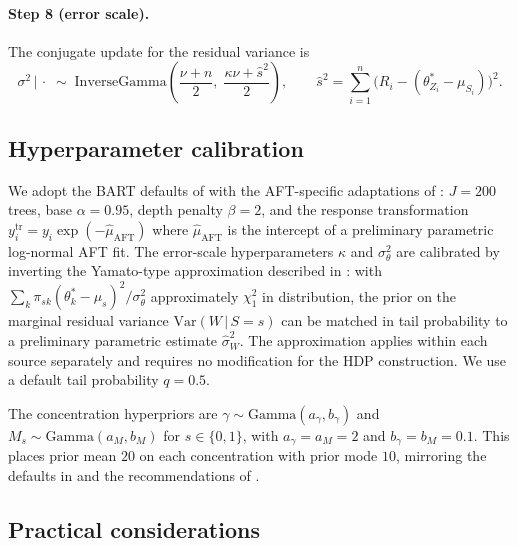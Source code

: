 \documentclass[11pt]{article}
\theoremstyle{plain}
\theoremstyle{definition}
\theoremstyle{remark}
\newcommand{\1}{\mathds{1}}
\newcommand{\Var}{\mathrm{Var}}
\newcommand{\given}{\,|\,}
\begin{document}
\paragraph{Step 8 (error scale).} The conjugate update for the residual variance is
\begin{equation}
\sigma^2 \given \cdot \;\sim\; \mathrm{InverseGamma}\!\left(\frac{\nu + n}{2},\; \frac{\kappa\nu + \hat s^2}{2}\right), \qquad \hat s^2 = \sum_{i=1}^n \big(R_i - (\theta_{Z_i}^* - \mu_{S_i})\big)^2.
\end{equation}

\subsection{Hyperparameter calibration}
\label{app:hdp-hyperparameters}

We adopt the BART defaults of \citet{chipman2010bart} with the AFT-specific adaptations of \citet{henderson2020individualized}: $J = 200$ trees, base $\alpha = 0.95$, depth penalty $\beta = 2$, and the response transformation $y_i^{\mathrm{tr}} = y_i \exp(-\hat\mu_{\mathrm{AFT}})$ where $\hat\mu_{\mathrm{AFT}}$ is the intercept of a preliminary parametric log-normal AFT fit. The error-scale hyperparameters $\kappa$ and $\sigma_\theta^2$ are calibrated by inverting the Yamato-type approximation \citep{yamato1984characteristic} described in \citet[Section 2.4]{henderson2020individualized}: with $\sum_k \pi_{sk}(\theta_k^* - \mu_s)^2 / \sigma_\theta^2$ approximately $\chi^2_1$ in distribution, the prior on the marginal residual variance $\Var(W \given S = s)$ can be matched in tail probability to a preliminary parametric estimate $\hat \sigma_W^2$. The approximation applies within each source separately and requires no modification for the HDP construction. We use a default tail probability $q = 0.5$.

The concentration hyperpriors are $\gamma \sim \mathrm{Gamma}(a_\gamma, b_\gamma)$ and $M_s \sim \mathrm{Gamma}(a_M, b_M)$ for $s \in \{0, 1\}$, with $a_\gamma = a_M = 2$ and $b_\gamma = b_M = 0.1$. This places prior mean $20$ on each concentration with prior mode $10$, mirroring the defaults in \citet{henderson2020individualized} and the recommendations of \citet{teh2006hierarchical}.

\subsection{Practical considerations}
\label{app:hdp-practical}
\end{document}
